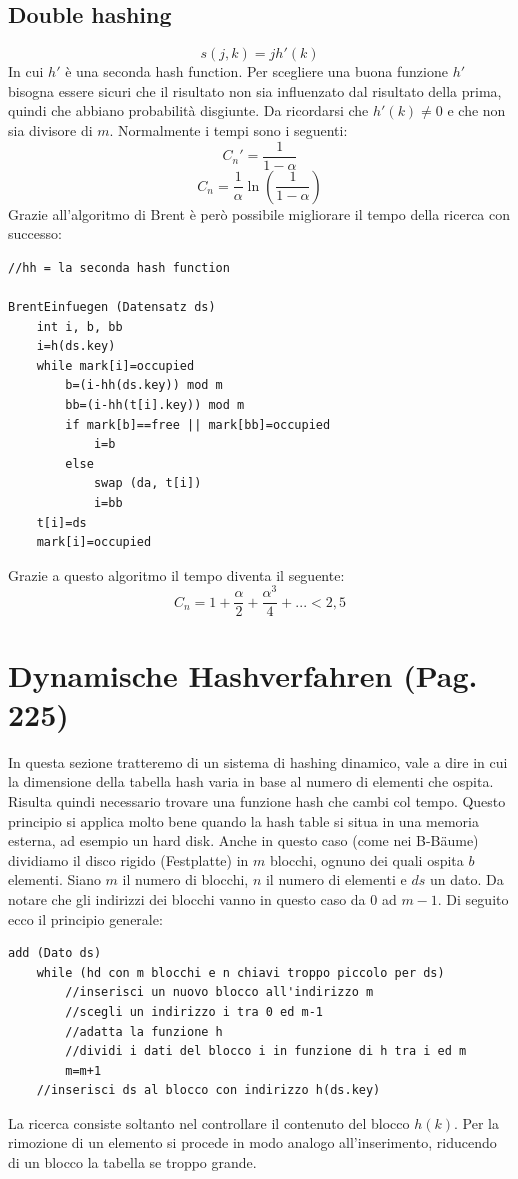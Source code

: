 \documentclass[a4paper]{book}
\newcommand{\lstIndent}{4}
\begin{document}
\subsection{Double hashing}
$$s(j,k)=jh'(k) $$
In cui $h'$ è una seconda hash function. Per scegliere una buona funzione $h'$ bisogna essere sicuri che il risultato non sia influenzato dal risultato della prima, quindi che abbiano probabilità disgiunte. Da ricordarsi che $h'(k) \neq 0$ e che non sia divisore di $m$. Normalmente i tempi sono i seguenti:
$$ C_n '= \frac{1}{1-\alpha} $$
$$ C_n = \frac{1}{\alpha} \ln \left(\frac{1}{1-\alpha}\right)$$
Grazie all'algoritmo di Brent è però possibile migliorare il tempo della ricerca con successo:
\begin{lstlisting}[tabsize=\lstIndent]
//hh = la seconda hash function

BrentEinfuegen (Datensatz ds)
	int i, b, bb
	i=h(ds.key)
	while mark[i]=occupied
		b=(i-hh(ds.key)) mod m
		bb=(i-hh(t[i].key)) mod m
		if mark[b]==free || mark[bb]=occupied
			i=b
		else
			swap (da, t[i])
			i=bb
	t[i]=ds
	mark[i]=occupied			
\end{lstlisting}
Grazie a questo algoritmo il tempo diventa il seguente:
$$C_n = 1+\frac{\alpha}{2}+\frac{\alpha ^3}{4}+... <2,5$$
\section{Dynamische Hashverfahren (Pag. 225)}
In questa sezione tratteremo di un sistema di hashing dinamico, vale a dire in cui la dimensione della tabella hash varia in base al numero di elementi che ospita. Risulta quindi necessario trovare una funzione hash che cambi col tempo. Questo principio si applica molto bene quando la hash table si situa in una memoria esterna, ad esempio un hard disk. Anche in questo caso (come nei B-Bäume) dividiamo il disco rigido (Festplatte) in $m$ blocchi, ognuno dei quali ospita $b$ elementi. Siano $m$ il numero di blocchi, $n$ il numero di elementi e $ds$ un dato. Da notare che gli indirizzi dei blocchi vanno in questo caso da $0$ ad $m-1$. Di seguito ecco il principio generale:
\begin{lstlisting}
add (Dato ds)
	while (hd con m blocchi e n chiavi troppo piccolo per ds)
		//inserisci un nuovo blocco all'indirizzo m
		//scegli un indirizzo i tra 0 ed m-1
		//adatta la funzione h
		//dividi i dati del blocco i in funzione di h tra i ed m
		m=m+1
	//inserisci ds al blocco con indirizzo h(ds.key)	
\end{lstlisting}
La ricerca consiste soltanto nel controllare il contenuto del blocco $h(k)$. Per la rimozione di un elemento si procede in modo analogo all'inserimento, riducendo di un blocco la tabella se troppo grande.
\end{document}
